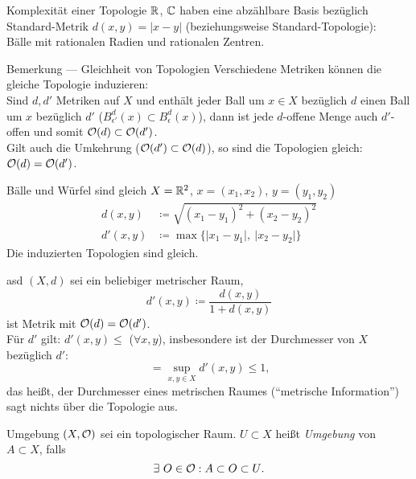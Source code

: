 \begin{example}{Komplexität einer Topologie}
  $ \mathbb{R} $, $ \mathbb{C} $ haben eine abzählbare Basis bezüglich Standard-Metrik $ d(x,y) = \vert x - y \vert $ (beziehungsweise Standard-Topologie): \\
  Bälle mit rationalen Radien und rationalen Zentren.
\end{example}

\begin{bla}{Bemerkung --- Gleichheit von Topologien}
  Verschiedene Metriken können die gleiche Topologie induzieren: \\
  Sind $ d, d' $ Metriken auf $ X $ und enthält jeder Ball um $ x \in X $ bezüglich $ d $ einen Ball um $ x $ bezüglich $ d' $ ($ B_{\epsilon'}^d(x) \subset B_\epsilon^d(x) $), dann ist jede $ d $-offene Menge auch $ d' $-offen und somit $ \mathcal{O}(d) \subset \mathcal{O}(d') $. \\
  Gilt auch die Umkehrung ($ \mathcal{O}(d') \subset \mathcal{O}(d) $), so sind die Topologien gleich: $ \mathcal{O}(d) = \mathcal{O}(d') $.
\end{bla}

\begin{example}{Bälle und Würfel sind gleich}
  $ X = \mathbb{R}^2 $, $ x = (x_1, x_2) $, $ y = (y_1, y_2) $
  \begin{align*}
    d(x,y) &\coloneqq \sqrt{(x_1-y_1)^2+(x_2-y_2)^2} \\
    d'(x,y) &\coloneqq \max\{ \vert x_1-y_1\vert, \ \vert x_2-y_2 \vert \}
  \end{align*}
  Die induzierten Topologien sind gleich.
\end{example}

\begin{example}{asd}
  $ (X, d) $ sei ein beliebiger metrischer Raum,
  \begin{equation*}
    d'(x,y) \coloneqq \frac{d(x,y)}{1 + d(x,y)}
  \end{equation*}
  ist Metrik mit $ \mathcal{O}(d) = \mathcal{O}(d') $. \\
  Für $ d' $ gilt: $ d'(x,y) \leq $ ($ \forall x,y $), insbesondere ist der Durchmesser von $ X $ bezüglich $ d' $:
  \begin{equation*}
    = \sup_{x,y \in X}d'(x,y) \leq 1\text{,}
  \end{equation*}
  das heißt, der Durchmesser eines metrischen Raumes (``metrische Information'') sagt nichts über die Topologie aus.
\end{example}

\begin{definition}{Umgebung}
  $ (X, \mathcal{O}) $ sei ein topologischer Raum. $ U \subset X $ heißt \emph{Umgebung} von $ A \subset X $, falls
  \begin{equation*}
    \exists \ O \in \mathcal{O} : A \subset O \subset U\text{.}
  \end{equation*}
\end{definition}